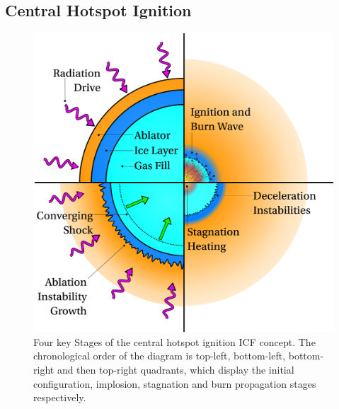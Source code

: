 \subsection{Central Hotspot Ignition}%
\label{sec:intro_centralhotspot}

\begin{figure}[t!]
    \includegraphics[width=0.7\linewidth]{Introduction/Images/hotspot ignition white.png}
    \centering
    \caption{Four key Stages of the central hotspot ignition \ac{ICF} concept.
    The chronological order of the diagram is top-left, bottom-left, bottom-right and then top-right quadrants, which display the initial configuration, implosion, stagnation and burn propagation stages respectively.
    }%
    \label{fig:intro_hotspot}
\end{figure}

